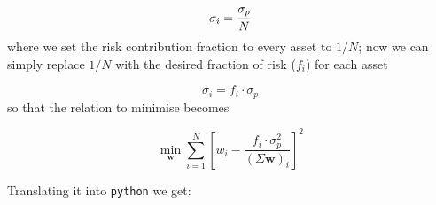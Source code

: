 \begin{equation} \sigma _{i}=\cfrac{\sigma_p}{N} \end{equation}
where we set the risk contribution fraction to every asset to \(1/N\);
now we can simply replace \(1/N\) with the desired fraction of risk (\(f_i\)) for each asset

\begin{equation} \sigma _{i}=f_i \cdot \sigma_p \end{equation}
so that the relation to minimise becomes

\begin{equation} \underset{\mathbf{w}}{\min} \sum _{i=1}^{N}\left[w_{i}-{\frac {f_i \cdot \sigma_p^{2}}{(\Sigma \mathbf{w})_{i}}}\right]^{2} \end{equation}

Translating it into \texttt{python} we get:


